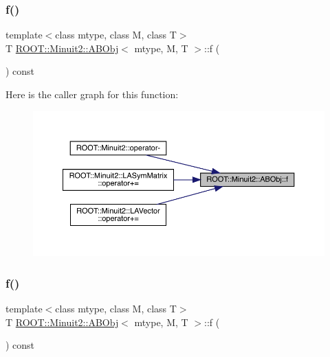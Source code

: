 \subsubsection{\texorpdfstring{f()}{f()}\hspace{0.1cm}{\footnotesize\ttfamily [1/2]}}
{\footnotesize\ttfamily template$<$class mtype, class M, class T$>$ \\
T \mbox{\hyperlink{classROOT_1_1Minuit2_1_1ABObj}{R\+O\+O\+T\+::\+Minuit2\+::\+A\+B\+Obj}}$<$ mtype, M, T $>$\+::f (\begin{DoxyParamCaption}{ }\end{DoxyParamCaption}) const\hspace{0.3cm}{\ttfamily [inline]}}

Here is the caller graph for this function\+:\nopagebreak
\begin{figure}[H]
\begin{center}
\leavevmode
\includegraphics[width=350pt]{d8/d4e/classROOT_1_1Minuit2_1_1ABObj_aa640f928a8ec245b70d4ac294e1418e5_icgraph}
\end{center}
\end{figure}
\mbox{\label{classROOT_1_1Minuit2_1_1ABObj_aa640f928a8ec245b70d4ac294e1418e5}} 
\subsubsection{\texorpdfstring{f()}{f()}\hspace{0.1cm}{\footnotesize\ttfamily [2/2]}}
{\footnotesize\ttfamily template$<$class mtype, class M, class T$>$ \\
T \mbox{\hyperlink{classROOT_1_1Minuit2_1_1ABObj}{R\+O\+O\+T\+::\+Minuit2\+::\+A\+B\+Obj}}$<$ mtype, M, T $>$\+::f (\begin{DoxyParamCaption}{ }\end{DoxyParamCaption}) const\hspace{0.3cm}{\ttfamily [inline]}}

